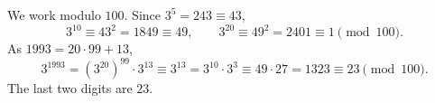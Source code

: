 We work modulo $100$. Since $3^5=243\equiv43$,
\[3^{10}\equiv43^2=1849\equiv49,\qquad 3^{20}\equiv49^2=2401\equiv1\pmod{100}.\]
As $1993=20\cdot99+13$,
\[3^{1993}=\left(3^{20}\right)^{99}\cdot3^{13}\equiv3^{13}=3^{10}\cdot3^3\equiv49\cdot27=1323\equiv23\pmod{100}.\]
The last two digits are $\boxed{23}$.
